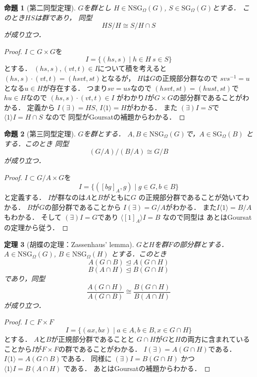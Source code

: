 \documentclass[leqno]{jsarticle}
\newtheorem{thm}{定理}
\newtheorem{prop}[thm]{命題}
\newcommand{\myproja}[1]{(\exists)#1}
\newcommand{\myprojb}[1]{#1(\exists)}
\newcommand{\mysliceb}[2]{#1\langle #2\rangle}
\newcommand{\myslicea}[2]{\langle #2\rangle#1}
\newcommand{\mynsgo}[2]{\mathrm{NSG}_{#2}(#1)}
\newcommand{\mysgo}[2]{\mathrm{SG}_{#2}(#1)}
\begin{document}
\begin{prop}[第二同型定理]
$G$を群とし
$H\in \mynsgo{G}{\Omega}$, 
 $S\in \mysgo{G}{\Omega}$とする．
 このとき$HS$は群であり，
 同型
 \[
 HS/H\cong S/H\cap S
 \]
 が成り立つ．
\end{prop}
\begin{proof}
$I\subset G\times G$を
\[
I=\{(hs, s)\mid h\in H\ s\in S\}
\]
とする．
$(hs, s), (vt, t)\in I$について積を考えると
$(hs, s)\cdot (vt, t)=(hsvt, st)$となるが，
$H$は$G$の正規部分群なので
$svs^{-1}=u$となる$u\in H$が存在する．
つまり$sv=us$なので
$(hsvt, st)=(hust, st)$で$hu\in H$なので
$(hs, s)\cdot (vt, t)\in I$
がわかり$I$が$G\times G$の部分群であることがわかる．
定義から
$\myprojb{I}=HS$, 
$\mysliceb{I}{1}=H$がわかる．
また
$\myproja{I}=S$で
$\myslicea{I}{1}=H\cap S$
なので
同型がGoursatの補題からわかる．
\end{proof}

\begin{prop}[第三同型定理]
$G$を群とする．
$A, B\in \mynsgo{G}{\Omega}$で，$
A\in \mysgo{B}{\Omega}$
とする．このとき
同型
\[
(G/A)/(B/A)\cong G/B
\]
が成り立つ．
\end{prop}
\begin{proof}
$I\subset G/A\times G$を
\[
I=\{([bg]_A, g)\mid g\in G, b\in B\}
\]
と定義する．
$I$が群なのは$A$と$B$がともに$G$
の正規部分群であることが効いてわかる．
$B$が$G$の部分群であることから
$\myprojb{I}=G/A$がわかる．
また$\mysliceb{I}{1}=B/A$もわかる．
そして
$\myproja{I}=G$であり
$\myslicea{I}{[1]_{A}}=B$
なので同型は
あとはGoursatの定理から従う．
\end{proof}

\begin{thm}[胡蝶の定理：Zassenhaus' lemma]
$G$と$H$を群$F$の部分群とする．
$A\in \mynsgo{G}{\Omega}$, 
$B\in \mynsgo{H}{\Omega}$
とする．このとき
\[
A(G\cap B)\unlhd A(G\cap H)
\]
\[
B(A\cap H)\unlhd B(G\cap H)
\]
であり，同型
\[
\frac{A(G\cap H)}{A(G\cap B)}\cong \frac{ B(G\cap H)}{B(A\cap H)}
\]
が成り立つ．
\end{thm}
\begin{proof}
$I\subset F\times F$
\[
I=\{(ax, bx)\mid a\in A, b\in B, x\in G\cap H\}
\] 
とする．
$A$と$B$が正規部分群であることと
$G\cap H$が$G$と$H$の両方に含まれていることから$I$が$F\times F$の群であることがわかる．
$\myprojb{I}=A(G\cap H)$である．
$\mysliceb{I}{1}=A(G\cap B)$である．
同様に
$\myproja{I}=B(G\cap H)$
かつ
$\myslicea{I}{1}=B(A\cap H)$
である．
あとはGoursatの補題からわかる．
\end{proof}
\end{document}
